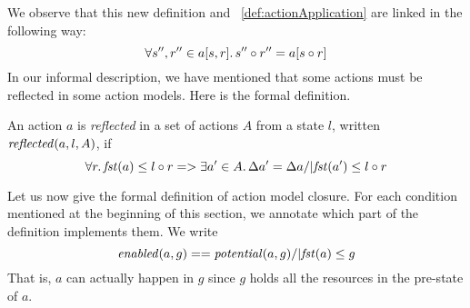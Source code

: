 %
%
We observe that this new definition and ~\ref{def:actionApplication} are linked in the following way: 
%
\[
	\forall s'', r'' \in a[s, r] .\, s'' \circ r'' = a[s\circ r]
\]
%
In our informal description, we have mentioned that some actions must be reflected in some action models. Here is the formal definition.
%
%
\begin{definition}
An action $a$ is \emph{reflected} in a set of actions $A$ from a state $l$, written $\mathit{reflected}(a,l,A)$, if
%
\[
  \forall r.\, \mathit{fst}(a)\leq l\circ r =>
  \exists a'\in A.\, \Delta {a'} = \Delta {a} /| \mathit{fst}(a')\leq l\circ r
\]
\end{definition}
%
%
Let us now give the formal definition of action model closure. For each condition mentioned at the beginning of this section, we annotate which part of the definition implements them. We write
%
\[
\mathit{enabled}(a,g) == \mathit{potential}(a,g) /| \mathit{fst}(a)\leq g
\]
%
That is, $a$ can actually happen in $g$ since $g$ holds all the resources in the pre-state of $a$.
%
%
